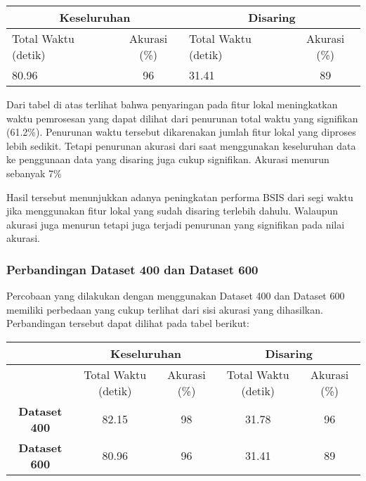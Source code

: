 \begin{table}[H]
	\centering
	\begin{tabular}{|cc|cc|}
		\hline
		\multicolumn{2}{|c|}{\textbf{Keseluruhan}}                        & \multicolumn{2}{c|}{\textbf{Disaring}}                           \\ \hline
		\multicolumn{1}{|l|}{Total Waktu (detik)} & Akurasi (\%) & \multicolumn{1}{l|}{Total Waktu (detik)} & Akurasi (\%) \\ \hline
		\multicolumn{1}{|l|}{80.96}               & 96           & \multicolumn{1}{l|}{31.41}               & 89           \\ \hline
	\end{tabular}
\end{table}

Dari tabel di atas terlihat bahwa penyaringan pada fitur lokal meningkatkan waktu pemrosesan yang dapat dilihat dari penurunan total waktu yang signifikan (61.2\%). Penurunan waktu tersebut dikarenakan jumlah fitur lokal yang diproses lebih sedikit. Tetapi penurunan akurasi dari saat menggunakan keseluruhan data ke penggunaan data yang disaring juga cukup signifikan. Akurasi menurun sebanyak 7\%

Hasil tersebut menunjukkan adanya peningkatan performa BSIS dari segi waktu jika menggunakan fitur lokal yang sudah disaring terlebih dahulu. Walaupun akurasi juga menurun tetapi juga terjadi penurunan yang signifikan pada nilai akurasi.

\subsubsection{Perbandingan Dataset 400 dan Dataset 600}
Percobaan yang dilakukan dengan menggunakan Dataset 400 dan Dataset 600 memiliki perbedaan yang cukup terlihat dari sisi akurasi yang dihasilkan. Perbandingan tersebut dapat dilihat pada tabel berikut:
\begin{table}[H]
	\centering
	\begin{tabular}{|c|c|c|c|c|} 
		\hline
		& \multicolumn{2}{c|}{\textbf{Keseluruhan}}   & \multicolumn{2}{c|}{\textbf{Disaring}}       \\ 
		\hline
		& Total Waktu (detik) & Akurasi (\%) & Total Waktu (detik) & Akurasi (\%)  \\ 
		\hline
		\textbf{Dataset 400} & 82.15               & 98           & 31.78               & 96            \\ 
		\hline
		\textbf{Dataset 600} & 80.96               & 96           & 31.41               & 89            \\
		\hline
	\end{tabular}
\end{table}

